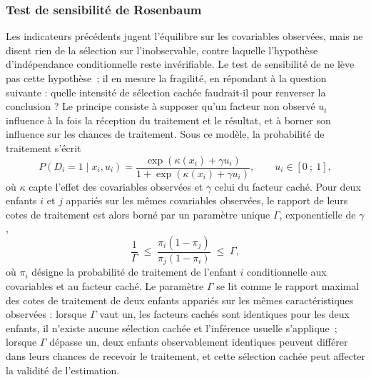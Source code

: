 \subsubsection{Test de sensibilité de Rosenbaum}
\label{subsec:rosenbaum}

Les indicateurs précédents jugent l'équilibre sur les covariables
observées, mais ne disent rien de la sélection sur l'inobservable, contre
laquelle l'hypothèse d'indépendance conditionnelle reste invérifiable. Le
test de sensibilité de \textcite{rosenbaum2002} ne lève pas cette
hypothèse~; il en mesure la fragilité, en répondant à la question
suivante : quelle intensité de sélection cachée faudrait-il pour renverser
la conclusion ? Le principe consiste à supposer qu'un facteur non observé
$u_i$ influence à la fois la réception du traitement et le résultat, et à
borner son influence sur les chances de traitement. Sous ce modèle, la
probabilité de traitement s'écrit
\begin{equation}
  P(D_i = 1 \mid x_i, u_i) = \frac{\exp\left(\kappa(x_i) + \gamma u_i\right)}
        {1 + \exp\left(\kappa(x_i) + \gamma u_i\right)},
  \qquad u_i \in [0~;~1],
  \label{eq:rosenbaum_modele}
\end{equation}
où $\kappa$ capte l'effet des covariables observées et $\gamma$ celui du
facteur caché. Pour deux enfants $i$ et $j$ appariés sur les mêmes
covariables observées, le rapport de leurs cotes de traitement est alors
borné par un paramètre unique $\Gamma$, exponentielle de $\gamma$,
\begin{equation}
  \frac{1}{\Gamma} \;\leq\;
  \frac{\pi_i (1 - \pi_j)}{\pi_j (1 - \pi_i)}
  \;\leq\; \Gamma,
  \label{eq:rosenbaum_bornes}
\end{equation}
où $\pi_i$ désigne la probabilité de traitement de l'enfant $i$
conditionnelle aux covariables et au facteur caché. Le paramètre
$\Gamma$ se lit comme le rapport maximal des cotes de traitement de deux
enfants appariés sur les mêmes caractéristiques observées : lorsque
$\Gamma$ vaut un, les facteurs cachés sont identiques pour les deux enfants,
il n'existe aucune sélection cachée et l'inférence usuelle s'applique~;
lorsque $\Gamma$ dépasse un, deux enfants observablement identiques
peuvent différer dans leurs chances de recevoir le traitement, et cette
sélection cachée peut affecter la validité de l'estimation.


